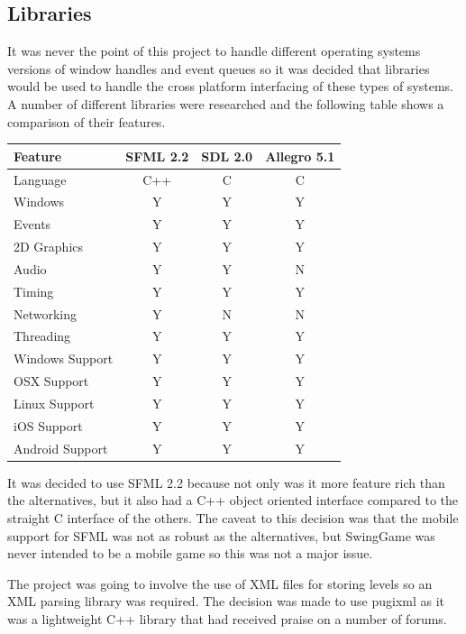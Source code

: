 \documentclass[]{report}
\begin{document}
		\subsection{Libraries}
		It was never the point of this project to handle different operating systems versions of window handles and event queues so it was decided that libraries would be used to handle the cross platform interfacing of these types of systems. A number of different libraries were researched and the following table shows a comparison of their features.
		
		\begin{tabular}[H]{ l || c | c | c }
			Feature & SFML 2.2\cite{sfml} & SDL 2.0\cite{sdl} & Allegro 5.1\cite{allegro} \\
			\hline
			\hline
			Language & C++ & C & C \\
			Windows & Y & Y  & Y \\
			Events & Y & Y & Y \\
			2D Graphics & Y & Y & Y \\
			Audio & Y & Y & N \\
			Timing & Y & Y & Y \\
			Networking & Y & N & N \\
			Threading & Y & Y & Y \\
			\hline
			Windows Support & Y & Y & Y \\
			OSX Support & Y & Y & Y \\
			Linux Support & Y & Y & Y \\
			iOS Support & Y\footnotemark & Y & Y \\
			Android Support &Y\footnotemark[1] & Y & Y \\
		\end{tabular}
		
		
		It was decided to use SFML 2.2\cite{sfml} because not only was it more feature rich than the alternatives, but it also had a C++ object oriented interface compared to the straight C interface of the others. The caveat to this decision was that the mobile support for SFML was not as robust as the alternatives, but SwingGame was never intended to be a mobile game so this was not a major issue.
		
		The project was going to involve the use of XML files for storing levels so an XML parsing library was required. The decision was made to use pugixml\cite{pugixml} as it was a lightweight C++ library that had received praise on a number of forums.
		
\end{document}
